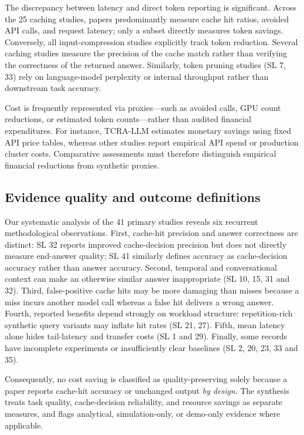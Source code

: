\IfFileExists{jair.cls}{\documentclass{jair}}{\documentclass[manuscript,nonacm,screen]{acmart}}
\begin{document}
The discrepancy between latency and direct token reporting is significant. Across the 25 caching studies, papers predominantly measure cache hit ratios, avoided API calls, and request latency; only a subset directly measures token savings. Conversely, all input-compression studies explicitly track token reduction. Several caching studies measure the precision of the cache match rather than verifying the correctness of the returned answer. Similarly, token pruning studies (SL 7, 33) rely on language-model perplexity or internal throughput rather than downstream task accuracy.

Cost is frequently represented via proxies---such as avoided calls, GPU count reductions, or estimated token counts---rather than audited financial expenditures. For instance, TCRA-LLM \cite{S39} estimates monetary savings using fixed API price tables, whereas other studies report empirical API spend or production cluster costs. Comparative assessments must therefore distinguish empirical financial reductions from synthetic proxies.

\subsection{Evidence quality and outcome definitions}
\label{sec:quality-caveats}

Our systematic analysis of the 41 primary studies reveals six recurrent methodological observations. First, cache-hit precision and answer correctness are distinct: SL 32 reports improved cache-decision precision but does not directly measure end-answer quality; SL 41 similarly defines accuracy as cache-decision accuracy rather than answer accuracy. Second, temporal and conversational context can make an otherwise similar answer inappropriate (SL 10, 15, 31 and 32). Third, false-positive cache hits may be more damaging than misses because a miss incurs another model call whereas a false hit delivers a wrong answer. Fourth, reported benefits depend strongly on workload structure: repetition-rich synthetic query variants may inflate hit rates (SL 21, 27). Fifth, mean latency alone hides tail-latency and transfer costs (SL 1 and 29). Finally, some records have incomplete experiments or insufficiently clear baselines (SL 2, 20, 23, 33 and 35).

Consequently, no cost saving is classified as quality-preserving solely because a paper reports cache-hit accuracy or unchanged output \emph{by design}. The synthesis treats task quality, cache-decision reliability, and resource savings as separate measures, and flags analytical, simulation-only, or demo-only evidence where applicable.
\end{document}

